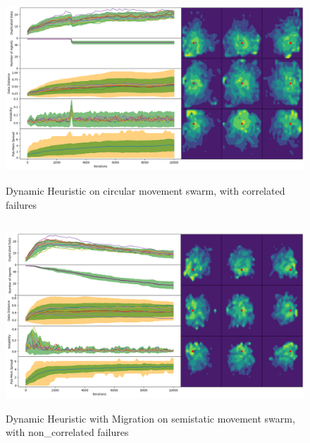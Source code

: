 \documentclass{UoYCSproject}
\begin{document}
\begin{figure}[htb]
\label{fig:circle_movement_con2}
\begin{center}
\centering
\includegraphics[height=7cm]{"./Dynamic_Heuristic/Circle_Move_con.png"}
\caption{Dynamic Heuristic on circular movement swarm, with correlated failures}
\end{center}
\end{figure}


\begin{figure}[htb]
\label{fig:static_movement_non3}
\begin{center}
\centering
\includegraphics[height=7cm]{"./Dynamic_Migration/Static_Move_non.png"}
\caption{Dynamic Heuristic with Migration on semi\-static movement swarm, with non\_correlated failures}
\end{center}
\end{figure}
\end{document}
